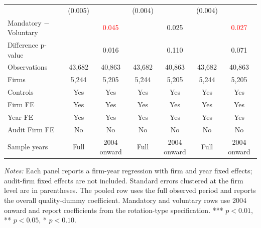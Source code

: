 \begin{table}[htbp]
\begin{threeparttable}
{\begin{tabular}{l cc cc cc}
 & (0.005) &  & (0.004) &  & (0.004) &  \\
Mandatory $-$ Voluntary &  & \textcolor{red}{0.045\sym{**}} &  & 0.025 &  & \textcolor{red}{0.027\sym{*}} \\
Difference p-value &  & 0.016 &  & 0.110 &  & 0.071 \\
Observations & 43,682 & 40,863 & 43,682 & 40,863 & 43,682 & 40,863 \\
Firms & 5,244 & 5,205 & 5,244 & 5,205 & 5,244 & 5,205 \\
\midrule
Controls & Yes & Yes & Yes & Yes & Yes & Yes \\
Firm FE & Yes & Yes & Yes & Yes & Yes & Yes \\
Year FE & Yes & Yes & Yes & Yes & Yes & Yes \\
Audit Firm FE & No & No & No & No & No & No \\
Sample years & Full & 2004 onward & Full & 2004 onward & Full & 2004 onward \\
\bottomrule
\end{tabular}}
\begin{tablenotes}\footnotesize
\item \textit{Notes:} Each panel reports a firm-year regression with firm and year fixed effects; audit-firm fixed effects are not included. Standard errors clustered at the firm level are in parentheses. The pooled row uses the full observed period and reports the overall quality-dummy coefficient. Mandatory and voluntary rows use 2004 onward and report coefficients from the rotation-type specification. *** \(p<0.01\), ** \(p<0.05\), * \(p<0.10\).
\end{tablenotes}
\end{threeparttable}
\end{table}
